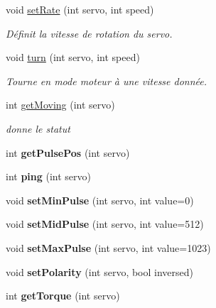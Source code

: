 \begin{DoxyCompactItemize}
\mbox{\label{classDynamixelDriver_a71ddbc9a7a468231b5334e95e9bd1eb3}} 
void \hyperlink{classDynamixelDriver_a71ddbc9a7a468231b5334e95e9bd1eb3}{set\+Rate} (int servo, int speed)
\begin{DoxyCompactList}\small\item\em Définit la vitesse de rotation du servo. \end{DoxyCompactList}\item 
\mbox{\label{classDynamixelDriver_a0dd50e159c075dc8e09a297501a5e23d}} 
void \hyperlink{classDynamixelDriver_a0dd50e159c075dc8e09a297501a5e23d}{turn} (int servo, int speed)
\begin{DoxyCompactList}\small\item\em Tourne en mode moteur à une vitesse donnée. \end{DoxyCompactList}\item 
int \hyperlink{classDynamixelDriver_a142a774bb716628483fa010727b84cdb}{get\+Moving} (int servo)
\begin{DoxyCompactList}\small\item\em donne le statut \end{DoxyCompactList}\item 
\mbox{\label{classDynamixelDriver_ae6a7d5cdcfd4bd372bf2a742b6ecaf4d}} 
int {\bfseries get\+Pulse\+Pos} (int servo)
\item 
\mbox{\label{classDynamixelDriver_ad97e88d5cb378677264ab8db5c4c9d6a}} 
int {\bfseries ping} (int servo)
\item 
\mbox{\label{classDynamixelDriver_a0e6d58c5b77563c22aeb5fc1e7ade822}} 
void {\bfseries set\+Min\+Pulse} (int servo, int value=0)
\item 
\mbox{\label{classDynamixelDriver_a61717d5a82e26a80d0a01df34ecf1b6f}} 
void {\bfseries set\+Mid\+Pulse} (int servo, int value=512)
\item 
\mbox{\label{classDynamixelDriver_a827e50e566dd6d9e8e867c0db2b7d6c7}} 
void {\bfseries set\+Max\+Pulse} (int servo, int value=1023)
\item 
\mbox{\label{classDynamixelDriver_acb5ea6fee2bdb1ac9dc90c2dc7c027f2}} 
void {\bfseries set\+Polarity} (int servo, bool inversed)
\item 
\mbox{\label{classDynamixelDriver_a3f431b5c398e201834c7b018a726a7c3}} 
int {\bfseries get\+Torque} (int servo)
\end{DoxyCompactItemize}
